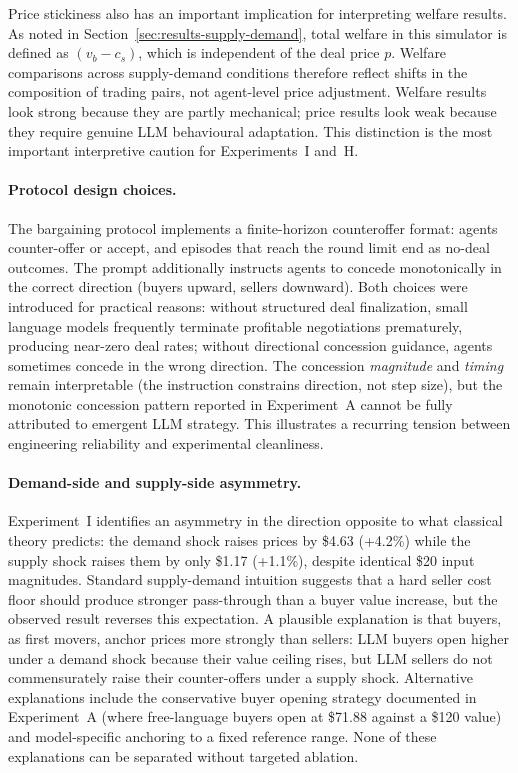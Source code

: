 Price stickiness also has an important implication for interpreting welfare results.  As noted in Section~\ref{sec:results-supply-demand}, total welfare in this simulator is defined as $(v_b - c_s)$, which is independent of the deal price $p$.  Welfare comparisons across supply-demand conditions therefore reflect shifts in the composition of trading pairs, not agent-level price adjustment.  Welfare results look strong because they are partly mechanical; price results look weak because they require genuine LLM behavioural adaptation.  This distinction is the most important interpretive caution for Experiments~I and~H.

\paragraph{Protocol design choices.}
The bargaining protocol implements a finite-horizon counteroffer format: agents counter-offer or accept, and episodes that reach the round limit end as no-deal outcomes.  The prompt additionally instructs agents to concede monotonically in the correct direction (buyers upward, sellers downward).  Both choices were introduced for practical reasons: without structured deal finalization, small language models frequently terminate profitable negotiations prematurely, producing near-zero deal rates; without directional concession guidance, agents sometimes concede in the wrong direction.  The concession \emph{magnitude} and \emph{timing} remain interpretable (the instruction constrains direction, not step size), but the monotonic concession pattern reported in Experiment~A cannot be fully attributed to emergent LLM strategy.  This illustrates a recurring tension between engineering reliability and experimental cleanliness.

\paragraph{Demand-side and supply-side asymmetry.}
Experiment~I identifies an asymmetry in the direction opposite to what classical theory predicts: the demand shock raises prices by \$4.63 (+4.2\%) while the supply shock raises them by only \$1.17 (+1.1\%), despite identical \$20 input magnitudes.  Standard supply-demand intuition suggests that a hard seller cost floor should produce stronger pass-through than a buyer value increase, but the observed result reverses this expectation.  A plausible explanation is that buyers, as first movers, anchor prices more strongly than sellers: LLM buyers open higher under a demand shock because their value ceiling rises, but LLM sellers do not commensurately raise their counter-offers under a supply shock.  Alternative explanations include the conservative buyer opening strategy documented in Experiment~A (where free-language buyers open at \$71.88 against a \$120 value) and model-specific anchoring to a fixed reference range.  None of these explanations can be separated without targeted ablation.

